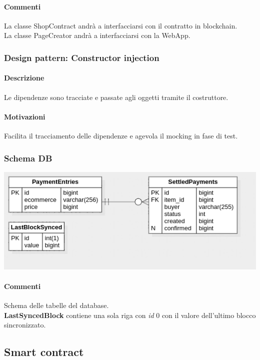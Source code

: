 \documentclass[a4paper, 12pt]{article}
\begin{document}
\paragraph{Commenti}
La classe ShopContract andrà a interfacciarsi con il contratto in blockchain.\\
La classe PageCreator andrà a interfacciarsi con la WebApp.
\subsubsection{Design pattern: Constructor injection}
\paragraph{Descrizione}
Le dipendenze sono tracciate e passate agli oggetti tramite il costruttore.
\paragraph{Motivazioni}
Facilita il tracciamento delle dipendenze e agevola il mocking in fase di test.
\subsubsection{Schema DB}
\includegraphics[width=1.0\textwidth]{db}
\paragraph{Commenti}
Schema delle tabelle del database.\\
\textbf{LastSyncedBlock} contiene una sola riga con \textit{id} 0 con il valore dell'ultimo blocco sincronizzato.

\newpage
\subsection{Smart contract}
\end{document}
